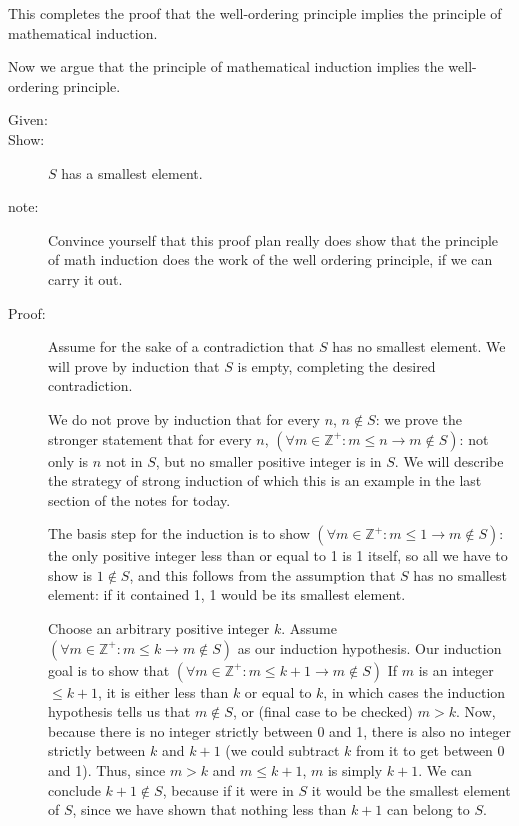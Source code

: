 \documentclass[12pt]{article}
\begin{document}
This completes the proof that the well-ordering principle implies the principle of mathematical induction.

Now we argue that the principle of mathematical induction implies the well-ordering principle.

\begin{description}

\item[Given:]


\item[Show:]  $S$ has a smallest element.

\item[note:]  Convince yourself that this proof plan really does show that the principle of math induction does the work of the well ordering principle, if we can carry it out.

\item[Proof:]  Assume for the sake of a contradiction that $S$ has no smallest element.  We will prove by induction that $S$ is empty, completing the desired contradiction.

We do not prove by induction that for every $n$, $n \not\in S$:  we prove the stronger statement that for every $n$, $(\forall m \in {\mathbb Z}^+: m \leq n \rightarrow m \not\in S)$:   not only is $n$ not in $S$, but no smaller positive integer is in $S$.
We will describe the strategy of strong induction of which this is an example in the last section of the notes for today.

The basis step for the induction is to show $(\forall m \in {\mathbb Z}^+:m \leq 1 \rightarrow m \not\in S)$:  the only positive integer less than or equal to 1 is 1 itself, so all we have
to show is $1 \not\in S$, and this follows from the assumption that $S$ has no smallest element:  if it contained 1, 1 would be its smallest element.

Choose an arbitrary positive integer $k$.  Assume $(\forall m \in {\mathbb Z}^+: m \leq k \rightarrow m \not\in S)$ as our induction hypothesis.  Our induction goal is to show that $(\forall m \in {\mathbb Z}^+: m \leq k+1 \rightarrow m \not\in S)$  If $m$ is an integer $\leq k+1$, it is either
less than $k$ or equal to $k$, in which cases the induction hypothesis tells us that $m \not\in S$, or (final case to be checked) $m>k$.
Now, because there is no integer strictly between 0 and 1, there is also no integer strictly between $k$ and $k+1$ (we could subtract $k$ from it to get between 0 and 1).  Thus, since $m>k$ and $m\leq k+1$, $m$ is simply $k+1$.  We can conclude $k+1 \not\in S$, because if it were in $S$ it would be the smallest element of $S$, since we have shown that nothing less than $k+1$ can belong to $S$.


\end{description}
\end{document}
